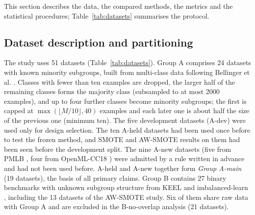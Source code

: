 \documentclass[preprint,nopreprintline]{elsarticle}
\theoremstyle{plain}
\theoremstyle{definition}
\begin{document}
This section describes the data, the compared methods, the metrics and the statistical procedures; Table~\ref{tab:datasets} summarises the protocol.

\subsection{Dataset description and partitioning}\label{sec:data}

The study uses 51 datasets (Table~\ref{tab:datasets}). Group A comprises 24 datasets with known minority subgroups, built from multi-class data following Bellinger et al. \cite{bellinger2024performance}. Classes with fewer than ten examples are dropped, the larger half of the remaining classes forms the majority class (subsampled to at most 2000 examples), and up to four further classes become minority subgroups; the first is capped at $\max(\lfloor M/10\rfloor,40)$ examples and each later one is about half the size of the previous one (minimum ten). The five development datasets (A-dev) were used only for design selection. The ten A-held datasets had been used once before to test the frozen method, and SMOTE and AW-SMOTE results on them had been seen before the development split. The nine A-new datasets (five from PMLB \cite{olson2017pmlb}, four from OpenML-CC18 \cite{vanschoren2014openml}) were admitted by a rule written in advance and had not been used before. A-held and A-new together form \emph{Group A-main} (19 datasets), the basis of all primary claims. Group B contains 27 binary benchmarks with unknown subgroup structure from KEEL \cite{alcala2011keel} and imbalanced-learn \cite{lemaitre2017imbalanced}, including the 13 datasets of the AW-SMOTE study. Six of them share raw data with Group A and are excluded in the B-no-overlap analysis (21 datasets).
\end{document}
